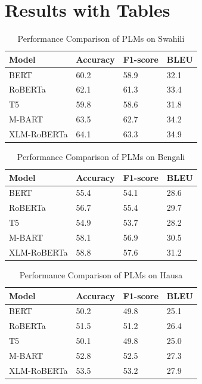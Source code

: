\documentclass{article}
\begin{document}
\section{Results with Tables}
\begin{table}[ht]
\centering
\caption{Performance Comparison of PLMs on Swahili}
\label{tab:swahili}
\begin{tabular}{@{}llll@{}}
\toprule
Model & Accuracy & F1-score & BLEU \\
\midrule
BERT & 60.2 & 58.9 & 32.1 \\
RoBERTa & 62.1 & 61.3 & 33.4 \\
T5 & 59.8 & 58.6 & 31.8 \\
M-BART & 63.5 & 62.7 & 34.2 \\
XLM-RoBERTa & 64.1 & 63.3 & 34.9 \\
\bottomrule
\end{tabular}
\end{table}

\begin{table}[ht]
\centering
\caption{Performance Comparison of PLMs on Bengali}
\label{tab:bengali}
\begin{tabular}{@{}llll@{}}
\toprule
Model & Accuracy & F1-score & BLEU \\
\midrule
BERT & 55.4 & 54.1 & 28.6 \\
RoBERTa & 56.7 & 55.4 & 29.7 \\
T5 & 54.9 & 53.7 & 28.2 \\
M-BART & 58.1 & 56.9 & 30.5 \\
XLM-RoBERTa & 58.8 & 57.6 & 31.2 \\
\bottomrule
\end{tabular}
\end{table}

\begin{table}[ht]
\centering
\caption{Performance Comparison of PLMs on Hausa}
\label{tab:hausa}
\begin{tabular}{@{}llll@{}}
\toprule
Model & Accuracy & F1-score & BLEU \\
\midrule
BERT & 50.2 & 49.8 & 25.1 \\
RoBERTa & 51.5 & 51.2 & 26.4 \\
T5 & 50.1 & 49.8 & 25.0 \\
M-BART & 52.8 & 52.5 & 27.3 \\
XLM-RoBERTa & 53.5 & 53.2 & 27.9 \\
\bottomrule
\end{tabular}
\end{table}
\end{document}
